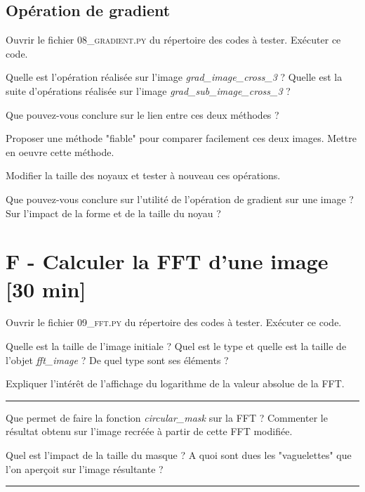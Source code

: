 \subsection{Opération de gradient}

\Manip Ouvrir le fichier \textsc{08\_gradient.py} du répertoire des codes à tester. Exécuter ce code.

\Quest Quelle est l'opération réalisée sur l'image \textsl{grad\_image\_cross\_3} ? Quelle est la suite d'opérations réalisée sur l'image \textsl{grad\_sub\_image\_cross\_3} ?

\Quest Que pouvez-vous conclure sur le lien entre ces deux méthodes ?

\Manip Proposer une méthode "fiable" pour comparer facilement ces deux images. Mettre en oeuvre cette méthode.

\Manip Modifier la taille des noyaux et tester à nouveau ces opérations.

\Quest Que pouvez-vous conclure sur l'utilité de l'opération de gradient sur une image ? Sur l'impact de la forme et de la taille du noyau ?



\newpage
\section{F - Calculer la FFT d'une image {[30 min]}}

\Manip Ouvrir le fichier \textsc{09\_fft.py} du répertoire des codes à tester. Exécuter ce code.

\Quest Quelle est la taille de l'image initiale ? Quel est le type et quelle est la taille de l'objet \textsl{fft\_image} ? De quel type sont ses éléments ?

\Quest Expliquer l'intérêt de l'affichage du logarithme de la valeur absolue de la FFT.

\noindent \rule{\linewidth}{1pt}

\Quest Que permet de faire la fonction \textsl{circular\_mask} sur la FFT ? Commenter le résultat obtenu sur l'image recréée à partir de cette FFT modifiée.

\Quest Quel est l'impact de la taille du masque ? A quoi sont dues les "vaguelettes" que l'on aperçoit sur l'image résultante ?

\noindent \rule{\linewidth}{1pt}


